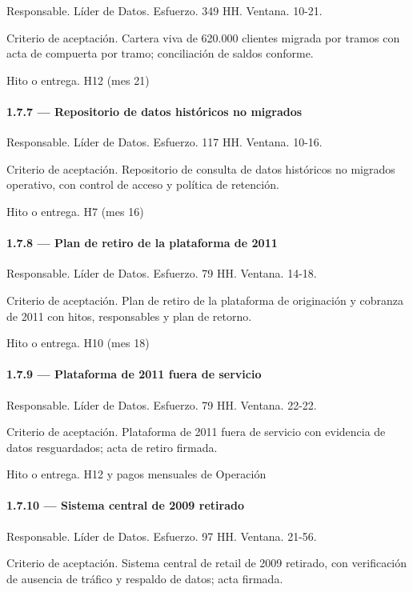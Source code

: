 \documentclass[11pt]{article}
\begin{document}
Responsable. Líder de Datos. Esfuerzo. 349 HH. Ventana. 10-21.

Criterio de aceptación. Cartera viva de 620.000 clientes migrada por tramos con acta de compuerta por tramo; conciliación de saldos conforme.

Hito o entrega. H12 (mes 21)

\paragraph{1.7.7 — Repositorio de datos históricos no migrados}

Responsable. Líder de Datos. Esfuerzo. 117 HH. Ventana. 10-16.

Criterio de aceptación. Repositorio de consulta de datos históricos no migrados operativo, con control de acceso y política de retención.

Hito o entrega. H7 (mes 16)

\paragraph{1.7.8 — Plan de retiro de la plataforma de 2011}

Responsable. Líder de Datos. Esfuerzo. 79 HH. Ventana. 14-18.

Criterio de aceptación. Plan de retiro de la plataforma de originación y cobranza de 2011 con hitos, responsables y plan de retorno.

Hito o entrega. H10 (mes 18)

\paragraph{1.7.9 — Plataforma de 2011 fuera de servicio}

Responsable. Líder de Datos. Esfuerzo. 79 HH. Ventana. 22-22.

Criterio de aceptación. Plataforma de 2011 fuera de servicio con evidencia de datos resguardados; acta de retiro firmada.

Hito o entrega. H12 y pagos mensuales de Operación

\paragraph{1.7.10 — Sistema central de 2009 retirado}

Responsable. Líder de Datos. Esfuerzo. 97 HH. Ventana. 21-56.

Criterio de aceptación. Sistema central de retail de 2009 retirado, con verificación de ausencia de tráfico y respaldo de datos; acta firmada.
\end{document}
